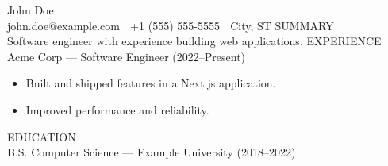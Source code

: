 \documentclass[letterpaper,11pt]{article}
\begin{document}
John Doe\\
john.doe@example.com | +1 (555) 555-5555 | City, ST
\vspace{4pt}
SUMMARY\\
Software engineer with experience building web applications.
\vspace{4pt}
EXPERIENCE\\
Acme Corp — Software Engineer (2022–Present)
\vspace{4pt}
\begin{itemize}
  \item Built and shipped features in a Next.js application.
  \item Improved performance and reliability.
\end{itemize}
\vspace{4pt}
EDUCATION\\
B.S. Computer Science — Example University (2018–2022)
\vspace{4pt}
\end{document}
